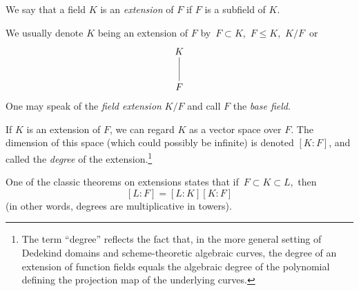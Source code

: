 \documentclass{article}
\begin{document}
We say that a field $K$ is an \emph{extension} of $F$ if $F$ is a subfield of $K$.

We usually denote $K$ being an extension of $F$ by \,$F\subset K$, \,$F\le K$, \,$K/F$\, or
$$
\xymatrix{
K \ar@{-}[d] \\
F
}
$$
One may speak of the {\em field extension} $K/F$ and call $F$ the {\em base field}.

If $K$ is an extension of $F$, we can regard $K$ as a vector space over $F$. The dimension of this space (which could possibly be infinite) is denoted $[K:F]$, and called the {\em degree} of the extension.\footnote{The term ``degree'' reflects the fact that, in the more general setting of Dedekind domains and scheme-theoretic algebraic curves, the degree of an extension of function fields equals the algebraic degree of the polynomial defining the projection map of the underlying curves.}

One of the classic theorems on extensions states that if \,$F\subset K\subset L$, \,then
$$[L:F]=[L:K][K:F]$$
(in other words, degrees are multiplicative in towers).
\end{document}
